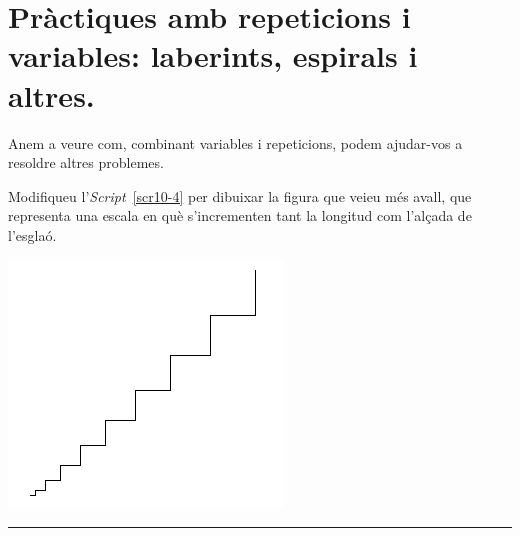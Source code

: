 \section{Pràctiques amb repeticions i variables: laberints, espirals i altres.}
Anem a veure com, combinant variables i repeticions, podem ajudar-vos a resoldre altres problemes.
\begin{center}
\colorbox{black}{}
\end{center}
{\small
\noindent
Modifiqueu l'\emph{Script}~\ref{scr10-4} per dibuixar la figura que veieu més avall, que representa una escala en què s'incrementen tant la longitud com l'alçada de l'esglaó.}
\begin{center}
\includegraphics[scale=0.25]{Imatges/figuraE10-2.png}
\end{center}
\noindent
\rule{\textwidth}{3pt}

